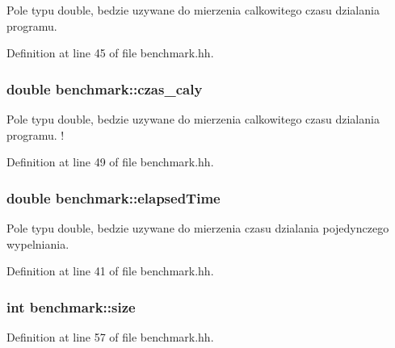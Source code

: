 Pole typu double, bedzie uzywane do mierzenia calkowitego czasu dzialania programu. 



Definition at line 45 of file benchmark.\-hh.

\hypertarget{classbenchmark_af677300c0b0a0086f306a0a08a6172b9}{
\subsubsection[{czas\-\_\-caly}]{\setlength{\rightskip}{0pt plus 5cm}double benchmark\-::czas\-\_\-caly\hspace{0.3cm}{\ttfamily [private]}}}\label{classbenchmark_af677300c0b0a0086f306a0a08a6172b9}


Pole typu double, bedzie uzywane do mierzenia calkowitego czasu dzialania programu. ! 



Definition at line 49 of file benchmark.\-hh.

\hypertarget{classbenchmark_a90e6eda0144befd3f3bc1a881904fb57}{
\subsubsection[{elapsed\-Time}]{\setlength{\rightskip}{0pt plus 5cm}double benchmark\-::elapsed\-Time\hspace{0.3cm}{\ttfamily [private]}}}\label{classbenchmark_a90e6eda0144befd3f3bc1a881904fb57}


Pole typu double, bedzie uzywane do mierzenia czasu dzialania pojedynczego wypelniania. 



Definition at line 41 of file benchmark.\-hh.

\hypertarget{classbenchmark_aa1ad33aa20b4497f764a6ff9a17bc83b}{
\subsubsection[{size}]{\setlength{\rightskip}{0pt plus 5cm}int benchmark\-::size\hspace{0.3cm}{\ttfamily [private]}}}\label{classbenchmark_aa1ad33aa20b4497f764a6ff9a17bc83b}


Definition at line 57 of file benchmark.\-hh.


